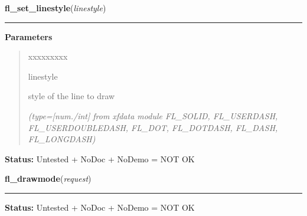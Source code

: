 \hspace{.8\funcindent}\begin{boxedminipage}{\funcwidth}

    \raggedright \textbf{fl\_set\_linestyle}(\textit{linestyle})

    \vspace{-1.5ex}

    \rule{\textwidth}{0.5\fboxrule}
\setlength{\parskip}{2ex}
\setlength{\parskip}{1ex}
      \textbf{Parameters}
      \vspace{-1ex}

      \begin{quote}
        \begin{Ventry}{xxxxxxxxx}

          \item[linestyle]

          style of the line to draw

            {\it (type=[num./int] from xfdata module FL\_SOLID, FL\_USERDASH, FL\_USERDOUBLEDASH, 
FL\_DOT, FL\_DOTDASH, FL\_DASH, FL\_LONGDASH)}

        \end{Ventry}

      \end{quote}

\textbf{Status:} Untested + NoDoc + NoDemo = NOT OK



    \end{boxedminipage}

    \label{xformslib:library:fl_drawmode}

    \vspace{0.5ex}

\hspace{.8\funcindent}\begin{boxedminipage}{\funcwidth}

    \raggedright \textbf{fl\_drawmode}(\textit{request})

    \vspace{-1.5ex}

    \rule{\textwidth}{0.5\fboxrule}
\setlength{\parskip}{2ex}
\setlength{\parskip}{1ex}
\textbf{Status:} Untested + NoDoc + NoDemo = NOT OK



    \end{boxedminipage}

